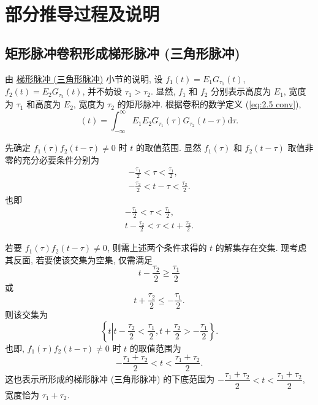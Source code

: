 \section{部分推导过程及说明} \label{部分推导过程及说明}

\subsection{矩形脉冲卷积形成梯形脉冲 (三角形脉冲)} \label{proofs 矩形脉冲卷积形成梯形脉冲 (三角形脉冲)}

由 \hyperref[2.5 梯形脉冲 (三角形脉冲)]{梯形脉冲 (三角形脉冲)} 小节的说明, 设 $f_1(t)=E_1G_{\tau_1}(t)$, $f_2(t)=E_2G_{\tau_2}(t)$, 并不妨设 $\tau_1>\tau_2$. 显然, $f_1$ 和 $f_2$ 分别表示高度为 $E_1$, 宽度为 $\tau_1$ 和高度为 $E_2$, 宽度为 $\tau_2$ 的矩形脉冲. 根据卷积的数学定义 (\ref{eq:2.5 conv}),
\begin{equation}
    [f_1*f_2](t)=\int_{-\infty}^{\infty}E_1E_2G_{\tau_1}(\tau)G_{\tau_2}(t-\tau)\mathrm{d}\tau.
\end{equation}

先确定 $f_1(\tau)f_2(t-\tau)\neq 0$ 时 $t$ 的取值范围. 显然 $f_1(\tau)$ 和 $f_2(t-\tau)$ 取值非零的充分必要条件分别为
\begin{gather*}
    -\frac{\tau_1}{2}<\tau<\frac{\tau_1}{2}, \\
    -\frac{\tau_2}{2}<t-\tau<\frac{\tau_2}{2}.
\end{gather*}
也即
\begin{gather}
    -\frac{\tau_1}{2}<\tau<\frac{\tau_1}{2}, \label{eq:proofs conv trapezoid tau 1} \\
    t-\frac{\tau_2}{2}<\tau<t+\frac{\tau_2}{2}. \label{eq:proofs conv trapezoid tau 2}
\end{gather}

若要 $f_1(\tau)f_2(t-\tau)\neq 0$, 则需上述两个条件求得的 $t$ 的解集存在交集. 现考虑其反面, 若要使该交集为空集, 仅需满足
\begin{equation}
    t-\frac{\tau_2}{2}\geq\frac{\tau_1}{2}
\end{equation}
或
\begin{equation}
    t+\frac{\tau_2}{2}\leq-\frac{\tau_1}{2}.
\end{equation}
则该交集为
\begin{equation*}
    \left\{t\left|t-\frac{\tau_2}{2}<\frac{\tau_1}{2}, t+\frac{\tau_2}{2}>-\frac{\tau_1}{2}\right.\right\}.
\end{equation*}
也即, $f_1(\tau)f_2(t-\tau)\neq 0$ 时 $t$ 的取值范围为
\begin{equation}
    -\frac{\tau_1+\tau_2}{2}<t<\frac{\tau_1+\tau_2}{2}.
\end{equation}
这也表示所形成的梯形脉冲 (三角形脉冲) 的下底范围为 $-\dfrac{\tau_1+\tau_2}{2}<t<\dfrac{\tau_1+\tau_2}{2}$, 宽度恰为 $\tau_1+\tau_2$.

